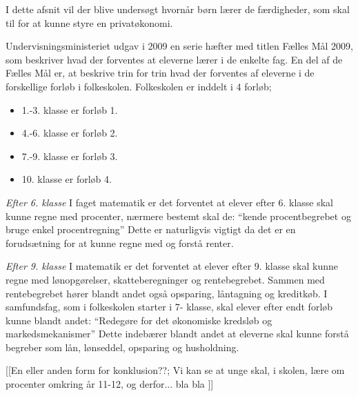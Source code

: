 I dette afsnit vil der blive undersøgt hvornår børn lærer de færdigheder, som skal til for at kunne styre en privatøkonomi.

Undervisningsministeriet udgav i 2009 en serie hæfter med titlen Fælles Mål 2009, som beskriver hvad der forventes at eleverne lærer i de enkelte fag. En del af de Fælles Mål er, at beskrive trin for trin hvad der forventes af eleverne i de forskellige forløb i folkeskolen. Folkeskolen er inddelt i 4 forløb;
\begin{itemize}
\item 1.-3. klasse er forløb 1.
\item 4.-6. klasse er forløb 2.
\item 7.-9. klasse er forløb 3.
\item 10. klasse er forløb 4.
\end{itemize}

\emph{Efter 6. klasse}
I faget matematik er det forventet at elever efter 6. klasse skal kunne regne med procenter, 
nærmere bestemt skal de: “kende procentbegrebet og bruge enkel procentregning”\cite{FallesMalMatematik}
Dette er naturligvis vigtigt da det er en forudsætning for at kunne regne med og forstå renter.

\emph{Efter 9. klasse}
I matematik er det forventet at elever efter 9. klasse skal kunne regne med lønopgørelser, skatteberegninger og rentebegrebet.\cite{FallesMalMatematik} Sammen med rentebegrebet hører blandt andet også opsparing, låntagning og kreditkøb.
I samfundsfag, som i folkeskolen starter i 7- klasse, skal elever efter endt forløb kunne blandt andet: “Redegøre for det økonomiske kredsløb og markedsmekanismer”\cite{FallesMalSamfundsfag}
Dette indebærer blandt andet at eleverne skal kunne forstå begreber som lån, lønseddel, opsparing og husholdning.

[[En eller anden form for konklusion??;
Vi kan se at unge skal, i skolen, lære om procenter omkring år 11-12, og derfor... bla bla ]]
